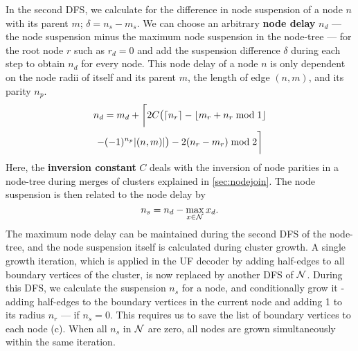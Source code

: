 In the second DFS, we calculate for the difference in node suspension of a node $n$ with its parent $m$; $\delta = n_s - m_s$. We can choose an arbitrary \textbf{node delay} $n_d$ --- the node suspension minus the maximum node suspension in the node-tree --- for the root node $r$ such as $r_d=0$ and add the suspension difference $\delta$ during each step to obtain $n_d$ for every node. This node delay of a node $n$ is only dependent on the node radii of itself and its parent $m$, the length of edge $(n,m)$, and its parity $n_p$. 
\begin{multline}\label{eq:delayequation}
    n_d = m_d + \bigg \lceil 2C\big(\ceil{n_r} - \floor{m_r + n_r \bmod 1}\\
    - (-1)^{n_p}\abs{(n,m)}\big) - 2(n_r - m_r) \bmod2 \bigg \rceil
\end{multline}
Here, the \textbf{inversion constant} $C$ deals with the inversion of node parities in a node-tree during merges of clusters explained in \ref{sec:nodejoin}. The node suspension is then related to the node delay by
\begin{equation*}
    n_s = n_d - \max_{x \in \mathcal{N}}{x_d}. 
\end{equation*}
The maximum node delay can be maintained during the second DFS of the node-tree, and the node suspension itself is calculated during cluster growth. A single growth iteration, which is applied in the UF decoder by adding half-edges to all boundary vertices of the cluster, is now replaced by another DFS of $\mathcal{N}$. During this DFS, we calculate the suspension $n_s$ for a node, and conditionally grow it - adding half-edges to the boundary vertices in the current node and adding 1 to its radius $n_r$ --- if $n_s = 0$. This requires us to save the list of boundary vertices to each node (c). When all $n_s$ in $\mathcal{N}$ are zero, all nodes are grown simultaneously within the same iteration. 

